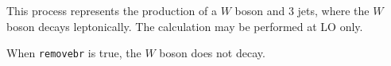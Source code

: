 \label{subsec:w3jets}

This process represents the production of a $W$ boson and $3$ jets,
where the $W$ boson decays leptonically. The calculation may be
performed at LO only.

When {\tt removebr} is true, the $W$ boson does not decay.
